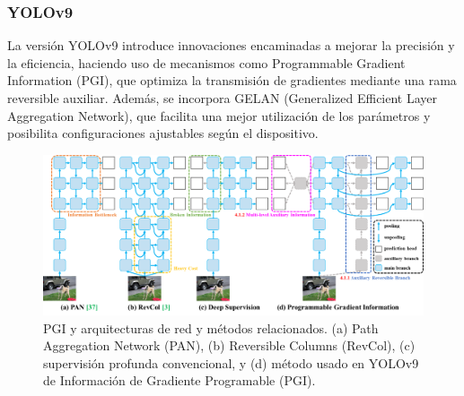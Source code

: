 \subsubsection{YOLOv9}
La versión YOLOv9 \cite{YOLOv9} introduce innovaciones encaminadas a mejorar la precisión y la eficiencia, haciendo uso de mecanismos como Programmable Gradient Information (PGI), que optimiza la transmisión de gradientes mediante una rama reversible auxiliar. Además, se incorpora GELAN (Generalized Efficient Layer Aggregation Network), que facilita una mejor utilización de los parámetros y posibilita configuraciones ajustables según el dispositivo.

\begin{figure}[htbp]
    \centering
    \includegraphics[width=0.95\linewidth]{figures/PGI YOLOv9.png}
    \caption[PGI de YOLOv9 y otras arquitecturas de red y métodos relacionados]{PGI y arquitecturas de red y métodos relacionados. (a) Path Aggregation Network (PAN), (b) Reversible Columns (RevCol), (c) supervisión profunda convencional, y (d) método usado en YOLOv9 de Información de Gradiente Programable (PGI).}
\end{figure}

